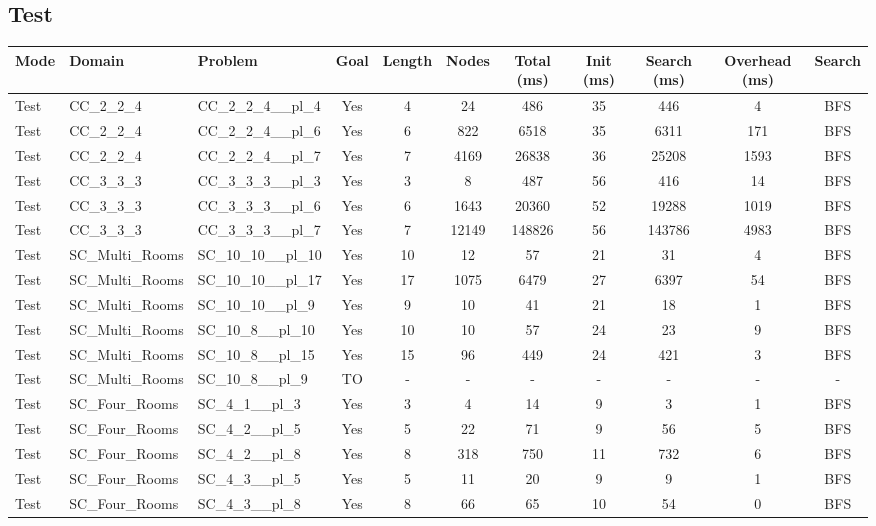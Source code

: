 \documentclass{article}
\begin{document}
\subsection*{Test}
\begin{tabular}{lllcccccccc}
\toprule
Mode & Domain & Problem & Goal & Length & Nodes & Total (ms) & Init (ms) & Search (ms) & Overhead (ms) & Search \\
\midrule
Test & CC\_2\_2\_4 & CC\_2\_2\_4\_\_pl\_4 & Yes & 4 & 24 & 486 & 35 & 446 & 4 & BFS \\
Test & CC\_2\_2\_4 & CC\_2\_2\_4\_\_pl\_6 & Yes & 6 & 822 & 6518 & 35 & 6311 & 171 & BFS \\
Test & CC\_2\_2\_4 & CC\_2\_2\_4\_\_pl\_7 & Yes & 7 & 4169 & 26838 & 36 & 25208 & 1593 & BFS \\
Test & CC\_3\_3\_3 & CC\_3\_3\_3\_\_pl\_3 & Yes & 3 & 8 & 487 & 56 & 416 & 14 & BFS \\
Test & CC\_3\_3\_3 & CC\_3\_3\_3\_\_pl\_6 & Yes & 6 & 1643 & 20360 & 52 & 19288 & 1019 & BFS \\
Test & CC\_3\_3\_3 & CC\_3\_3\_3\_\_pl\_7 & Yes & 7 & 12149 & 148826 & 56 & 143786 & 4983 & BFS \\
Test & SC\_Multi\_Rooms & SC\_10\_10\_\_pl\_10 & Yes & 10 & 12 & 57 & 21 & 31 & 4 & BFS \\
Test & SC\_Multi\_Rooms & SC\_10\_10\_\_pl\_17 & Yes & 17 & 1075 & 6479 & 27 & 6397 & 54 & BFS \\
Test & SC\_Multi\_Rooms & SC\_10\_10\_\_pl\_9 & Yes & 9 & 10 & 41 & 21 & 18 & 1 & BFS \\
Test & SC\_Multi\_Rooms & SC\_10\_8\_\_pl\_10 & Yes & 10 & 10 & 57 & 24 & 23 & 9 & BFS \\
Test & SC\_Multi\_Rooms & SC\_10\_8\_\_pl\_15 & Yes & 15 & 96 & 449 & 24 & 421 & 3 & BFS \\
Test & SC\_Multi\_Rooms & SC\_10\_8\_\_pl\_9 & TO & - & - & - & - & - & - & - \\
Test & SC\_Four\_Rooms & SC\_4\_1\_\_pl\_3 & Yes & 3 & 4 & 14 & 9 & 3 & 1 & BFS \\
Test & SC\_Four\_Rooms & SC\_4\_2\_\_pl\_5 & Yes & 5 & 22 & 71 & 9 & 56 & 5 & BFS \\
Test & SC\_Four\_Rooms & SC\_4\_2\_\_pl\_8 & Yes & 8 & 318 & 750 & 11 & 732 & 6 & BFS \\
Test & SC\_Four\_Rooms & SC\_4\_3\_\_pl\_5 & Yes & 5 & 11 & 20 & 9 & 9 & 1 & BFS \\
Test & SC\_Four\_Rooms & SC\_4\_3\_\_pl\_8 & Yes & 8 & 66 & 65 & 10 & 54 & 0 & BFS \\

\end{tabular}
\end{document}
